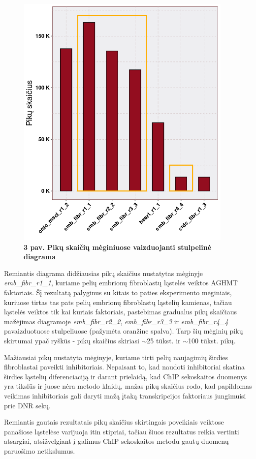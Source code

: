 \documentclass[12pt]{article}
\begin{document}
\begin{figure}[htb]
    \begin{center}
        \includegraphics[width=0.5\linewidth]{../Figures/total_peak_counts.png}
        \vspace{-2\baselineskip}
        \caption*{\small\textbf{3 pav. Pikų skaičių mėginiuose vaizduojanti
                                stulpelinė diagrama}}
    \end{center}
\end{figure}

Remiantis diagrama didžiausias pikų skaičius
nustatytas mėginyje \small\emph{emb\_fibr\_r1\_1}, kuriame pelių embrionų
fibroblastų ląstelės veiktos AGHMT faktoriais.
Šį rezultatą palyginus su kitais to paties eksperimento mėginiais, kuriuose
tirtas tas pats pelių embrionų fibroblastų ląstelių kamienas, tačiau ląstelės
veiktos tik kai kuriais faktoriais, pastebimas gradualus pikų skaičiaus
mažėjimas diagramoje
\small\emph{emb\_fibr\_r2\_2}, \small\emph{emb\_fibr\_r3\_3} ir
\small\emph{emb\_fibr\_r4\_4} pavaizduotuose stulpeliuose (pažymėta
oranžine spalva). Tarp šių mėginių pikų skirtumai ypač ryškūs - pikų
skaičius skiriasi \(\sim\)25 tūkst. ir \(\sim\)100 tūkst. pikų.

Mažiausiai pikų nustatyta mėginyje, kuriame tirti pelių naujagimių širdies
fibroblastai paveikti inhibitoriais. Nepaisant to, kad naudoti inhibitoriai
skatina širdies ląstelių diferenciaciją\cite{HEART_CELL_DIFF_ARTCL} ir darant
prielaidą, kad ChIP sekoskaitos duomenys yra tikslūs ir juose nėra
metodo klaidų, mažas pikų skaičius rodo, kad papildomas veikimas inhibitoriais
gali daryti mažą įtaką transkripcijos faktoriaus jungimuisi prie DNR sekų.

Remiantis gautais rezultatais pikų skaičius skirtingais poveikiais veiktose
panašiose ląstelėse varijuoja itin stipriai, tačiau šiuos rezultatus reikia
vertinti atsargiai, atsižvelgiant į galimus ChIP sekoskaitos metodu gautų
duomenų paruošimo netikslumus.
\end{document}
